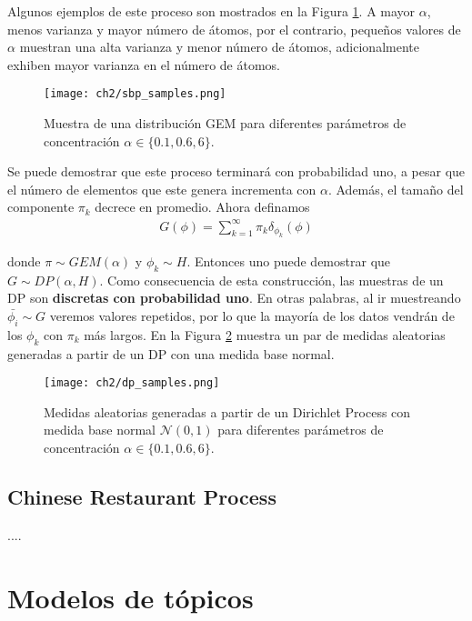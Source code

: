 \documentclass[letterpaper,12pt,oneside]{book} %
\begin{document}
Algunos ejemplos de este proceso son mostrados en la Figura \ref{img:sbp_samples}. A mayor $\alpha$, menos varianza y mayor número de átomos, por el contrario, pequeños valores de $\alpha$ muestran una alta varianza y menor número de átomos, adicionalmente exhiben mayor varianza en el número de átomos.

\begin{figure}
    \centering
    \texttt{[image: ch2/sbp\_samples.png]}
    \caption{Muestra de una distribución GEM para diferentes parámetros de concentración $\alpha\in \{0.1, 0.6, 6\}$.}
    \label{img:sbp_samples}
\end{figure}

Se puede demostrar que este proceso terminará con probabilidad uno, a pesar que el número de elementos que este genera incrementa con $\alpha$. Además, el tamaño del componente $\pi_{k}$ decrece en promedio. Ahora definamos 
\begin{align}
    G(\phi) = \sum_{k=1}^{\infty}\pi_{k}\delta_{\phi_{k}}(\phi)
\end{align}

donde $\pi \sim GEM(\alpha)$ y $\phi_{k} \sim H$. Entonces uno puede demostrar que $G \sim DP(\alpha, H)$. Como consecuencia de esta construcción, las muestras de un DP son \textbf{discretas con probabilidad uno}. En otras palabras, al ir muestreando $\bar{\phi_{i}}\sim G$ veremos valores repetidos, por lo que la mayoría de los datos vendrán de los $\phi_{k}$ con $\pi_{k}$ más largos. En la Figura \ref{img:dp_samples} muestra un par de medidas aleatorias generadas a partir de un DP con una medida base normal.\\

\begin{figure}
    \centering
    \texttt{[image: ch2/dp\_samples.png]}
    \caption{Medidas aleatorias generadas a partir de un Dirichlet Process con medida base normal $\mathcal{N}(0,1)$ para diferentes parámetros de concentración $\alpha\in \{0.1, 0.6, 6\}$.}
    \label{img:dp_samples}
\end{figure}


\subsection{Chinese Restaurant Process}
\label{sec:crp}
....


\section{Modelos de tópicos}
\end{document}

